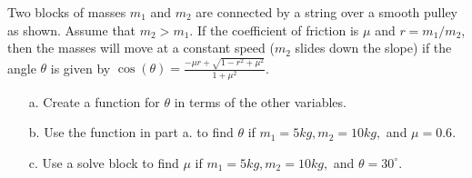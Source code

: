 {Two blocks of masses $m_1$ and $m_2$ are connected by a string over a smooth pulley as shown.  Assume that $m_2>m_1$.  If the coefficient of friction is $\mu$ and $r=m_1/m_2$, then the masses will move at a constant speed ($m_2$ slides down the slope) if the angle $\theta$ is given by $\displaystyle \cos(\theta) = \frac{-\mu r + \sqrt{1-r^2+\mu^2}}{1+\mu^2}$.

\begin{center}
\end{center}

\begin{itemize}
\item[a.] Create a function for $\theta$ in terms of the other variables.
\item[b.] Use the function in part a. to find $\theta$ if $m_1=5 kg, m_2=10 kg,$ and $\mu=0.6$.
\item[c.] Use a solve block to find $\mu$ if $m_1=5 kg, m_2=10 kg,$ and $\theta=30^\circ$.
\end{itemize}
}
{}
%
%
%
